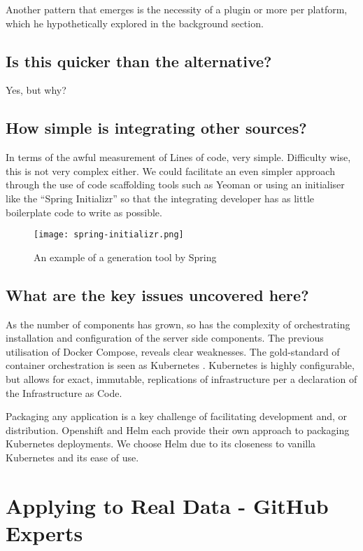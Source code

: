 Another pattern that emerges is the necessity of a plugin or more per platform, which he hypothetically explored in the background section.

\subsection{Is this quicker than the alternative?}

Yes, but why?

\subsection{How simple is integrating other sources?}

In terms of the awful measurement of Lines of code, very simple. Difficulty wise, this is not very complex either. We could facilitate an even simpler approach through the use of code scaffolding tools such as Yeoman or using an initialiser like the ``Spring Initializr'' so that the integrating developer has as little boilerplate code to write as possible.

\begin{figure}[h!]
	\centering
	\texttt{[image: spring-initializr.png]}
	\label{fig:springExample}
	\caption{An example of a generation tool by Spring}
\end{figure}

\subsection{What are the key issues uncovered here?}

As the number of components has grown, so has the complexity of orchestrating installation and configuration of the server side components. The previous utilisation of Docker Compose, reveals clear weaknesses. The gold-standard of container orchestration is seen as Kubernetes \parencite{kuberenetesOfficialSite}. Kubernetes is highly configurable, but allows for exact, immutable, replications of infrastructure per a declaration of the Infrastructure as Code.

Packaging any application is a key challenge of facilitating development and, or distribution. Openshift \parencite{openshiftSite} and Helm \parencite{helmOnlineResource} each provide their own approach to packaging Kubernetes deployments. We choose Helm due to its closeness to vanilla Kubernetes and its ease of use. 

\section{Applying to Real Data - GitHub Experts}

